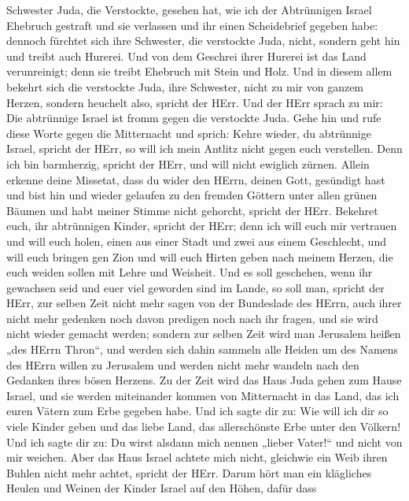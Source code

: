 Schwester Juda, die Verstockte, gesehen hat,  wie ich der
Abtrünnigen Israel Ehebruch gestraft und sie verlassen und ihr einen
Scheidebrief gegeben habe: dennoch fürchtet sich ihre Schwester, die
verstockte Juda, nicht, sondern geht hin und treibt auch Hurerei.
 Und von dem Geschrei ihrer Hurerei ist das Land
verunreinigt; denn sie treibt Ehebruch mit Stein und Holz. 
Und in diesem allem bekehrt sich die verstockte Juda, ihre Schwester,
nicht zu mir von ganzem Herzen, sondern heuchelt also, spricht der HErr.
 Und der HErr sprach zu mir: Die abtrünnige Israel ist
fromm gegen die verstockte Juda.  Gehe hin und rufe diese
Worte gegen die Mitternacht und sprich: Kehre wieder, du abtrünnige
Israel, spricht der HErr, so will ich mein Antlitz nicht gegen euch
verstellen. Denn ich bin barmherzig, spricht der HErr, und will nicht
ewiglich zürnen.  Allein erkenne deine Missetat, dass du
wider den HErrn, deinen Gott, gesündigt hast und bist hin und wieder
gelaufen zu den fremden Göttern unter allen grünen Bäumen und habt
meiner Stimme nicht gehorcht, spricht der HErr.  Bekehret
euch, ihr abtrünnigen Kinder, spricht der HErr; denn ich will euch mir
vertrauen und will euch holen, einen aus einer Stadt und zwei aus einem
Geschlecht, und will euch bringen gen Zion  und will euch
Hirten geben nach meinem Herzen, die euch weiden sollen mit Lehre und
Weisheit.  Und es soll geschehen, wenn ihr gewachsen seid
und euer viel geworden sind im Lande, so soll man, spricht der HErr, zur
selben Zeit nicht mehr sagen von der Bundeslade des HErrn, auch ihrer
nicht mehr gedenken noch davon predigen noch nach ihr fragen, und sie
wird nicht wieder gemacht werden;  sondern zur selben Zeit
wird man Jerusalem heißen „des HErrn Thron``, und werden sich dahin
sammeln alle Heiden um des Namens des HErrn willen zu Jerusalem und
werden nicht mehr wandeln nach den Gedanken ihres bösen Herzens.
 Zu der Zeit wird das Haus Juda gehen zum Hause Israel, und
sie werden miteinander kommen von Mitternacht in das Land, das ich euren
Vätern zum Erbe gegeben habe.  Und ich sagte dir zu: Wie
will ich dir so viele Kinder geben und das liebe Land, das allerschönste
Erbe unter den Völkern! Und ich sagte dir zu: Du wirst alsdann mich
nennen „lieber Vater!{}`` und nicht von mir weichen.  Aber
das Haus Israel achtete mich nicht, gleichwie ein Weib ihren Buhlen
nicht mehr achtet, spricht der HErr.  Darum hört man ein
klägliches Heulen und Weinen der Kinder Israel auf den Höhen, dafür dass
